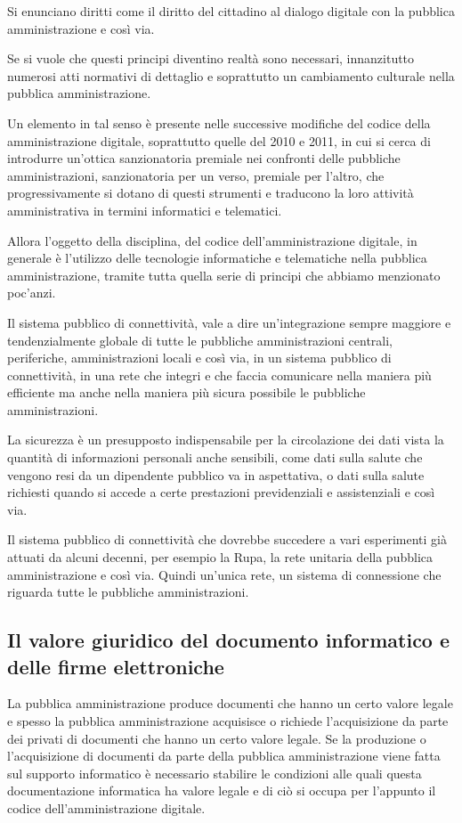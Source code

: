 Si enunciano diritti come il diritto del cittadino al dialogo digitale con la pubblica amministrazione e così via. 

Se si vuole che questi principi diventino realtà sono necessari, innanzitutto numerosi atti normativi di dettaglio e soprattutto un cambiamento culturale nella pubblica amministrazione. 

Un elemento in tal senso è presente nelle successive modifiche del codice della amministrazione digitale, soprattutto  quelle del 2010 e 2011, in cui si cerca di introdurre un'ottica sanzionatoria premiale nei confronti delle pubbliche amministrazioni, sanzionatoria per un verso, premiale per l'altro, che progressivamente si dotano di questi strumenti e traducono la loro attività amministrativa in termini informatici e telematici. 

Allora l'oggetto della disciplina, del codice dell'amministrazione digitale, in generale è l'utilizzo delle tecnologie informatiche e telematiche nella pubblica amministrazione, tramite tutta quella serie di principi che abbiamo menzionato poc'anzi. 

Il sistema pubblico di connettività, vale a dire un'integrazione sempre maggiore e tendenzialmente globale di tutte le pubbliche amministrazioni centrali, periferiche, amministrazioni locali e così via, in un sistema pubblico di connettività, in una rete che integri e che faccia comunicare nella maniera più efficiente ma anche nella maniera più sicura possibile le pubbliche amministrazioni. 

La sicurezza è un presupposto indispensabile per la circolazione dei dati vista la quantità di informazioni personali anche sensibili, come dati sulla salute che vengono resi da un dipendente pubblico va in aspettativa, o dati sulla salute richiesti quando si accede a certe prestazioni previdenziali e assistenziali e così via.

Il sistema pubblico di connettività che dovrebbe succedere a vari esperimenti già attuati da alcuni decenni, per esempio la Rupa, la rete unitaria della pubblica amministrazione e così via. 
Quindi un'unica rete, un sistema di connessione che riguarda tutte le pubbliche amministrazioni. 

\subsection{Il valore giuridico del documento informatico e delle firme elettroniche}
La pubblica amministrazione produce documenti che hanno un certo valore legale e spesso la pubblica amministrazione acquisisce o richiede l'acquisizione da parte dei privati di documenti che hanno un certo valore legale. Se la produzione o l'acquisizione di documenti da parte della pubblica amministrazione viene fatta sul supporto informatico è necessario stabilire le condizioni alle quali questa documentazione informatica ha valore legale e di ciò si occupa per l'appunto il codice dell'amministrazione digitale.

